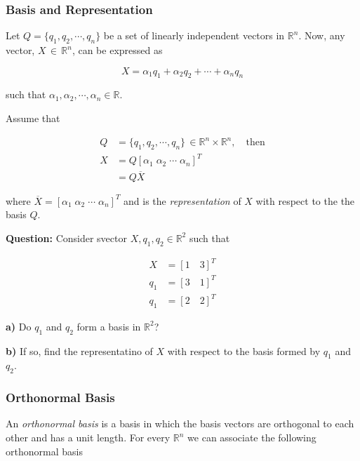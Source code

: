 \subsubsection{Basis and Representation}

Let $Q = \{q_1, q_2, \cdots, q_n \}$ be a set of linearly independent vectors in
$\mathbb{R}^n$. Now, any vector, $X \, \in \, \mathbb{R}^n$, can be expressed
as

\begin{equation} \label{eq:linear_combo_vector}
X = \alpha_1 q_1 + \alpha_2 q_2 + \cdots + \alpha_n q_n
\end{equation}

\noindent such that $\alpha_1, \alpha_2, \cdots, \alpha_n \in \mathbb{R}$.

Assume that

\begin{align}
  Q &= \{q_1, q_2, \cdots, q_n \} \, \in \mathbb{R}^n \times \mathbb{R}^n, \quad \text{then} \\
  X &= Q [\alpha_1 \; \alpha_2 \; \cdots \; \alpha_n]^T \\
    &= Q \overline{X}
\end{align}

\noindent where $\overline{X} = [\alpha_1 \; \alpha_2 \; \cdots \; \alpha_n]^T$
and is the \textit{representation} of $X$ with respect to the the basis $Q$.

\noindent \textbf{Question:} Consider svector $X, q_1, q_2 \in \mathbb{R}^2$
such that

\begin{align}
  X   &= [1 \quad 3]^T \\
  q_1 &= [3 \quad 1]^T \\
  q_1 &= [2 \quad 2]^T
\end{align}

\noindent \textbf{a)} Do $q_1$ and $q_2$ form a basis in $\mathbb{R}^2$?

\noindent \textbf{b)} If so, find the representatino of $X$ with respect to the
basis formed by $q_1$ and $q_2$.

\subsubsection{Orthonormal Basis}

An \textit{orthonormal basis} is a basis in which the basis vectors are
orthogonal to each other and has a unit length. For every $\mathbb{R}^n$ we can
associate the following orthonormal basis

